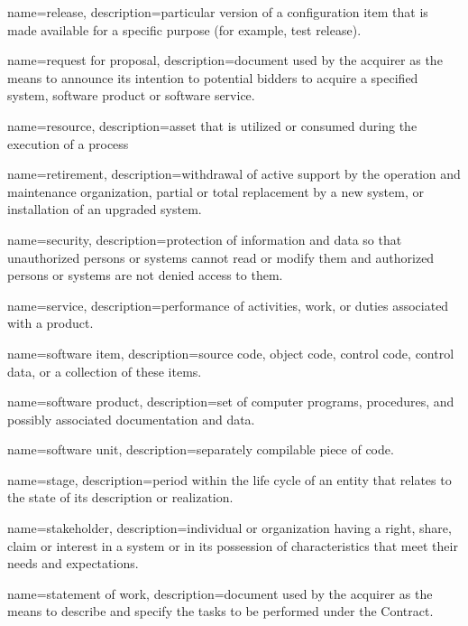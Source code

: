 {
	name=release,
	description={particular version of a configuration item that is made available for a specific purpose (for example, test release).}
}

{
	name=request for proposal,
	description={document used by the acquirer as the means to announce its intention to potential bidders to acquire a specified system, software product or software service.}
}

{
	name=resource,
	description={asset that is utilized or consumed during the execution of a process}
}

{
	name=retirement,
	description={withdrawal of active support by the operation and maintenance organization, partial or total replacement by a new system, or installation of an upgraded system.}
}



{
	name=security,
	description={protection of information and data so that unauthorized persons or systems cannot read or modify them and authorized persons or systems are not denied access to them.}
}

{
	name=service,
	description={performance of activities, work, or duties associated with a product.}
}

{
	name=software item,
	description={source code, object code, control code, control data, or a collection of these items.}
}

{
	name=software product,
	description={set of computer programs, procedures, and possibly associated documentation and data.}
}

{
	name=software unit,
	description={separately compilable piece of code.}
}

{
	name=stage,
	description={period within the life cycle of an entity that relates to the state of its description or realization.}
}

{
	name=stakeholder,
	description={individual or organization having a right, share, claim or interest in a system or in its possession of characteristics that meet their needs and expectations.}
}

{
	name=statement of work,
	description={document used by the acquirer as the means to describe and specify the tasks to be performed under the Contract.}
}

